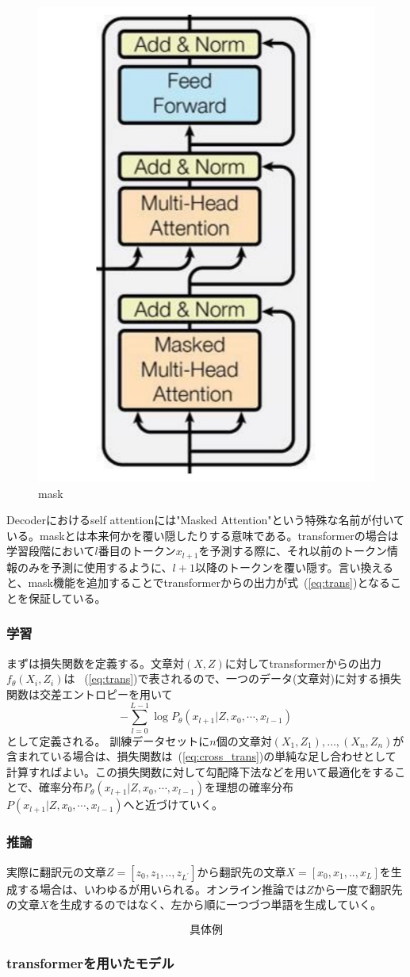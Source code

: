 \begin{figure}
  \centering
  \includegraphics[width=0.5\linewidth]{fig/decoder.pdf}
  \caption{mask}
\label{fig:mask}
\end{figure}

Decoderにおけるself attentionには"Masked Attention"という特殊な名前が付いている。maskとは本来何かを覆い隠したりする意味である。transformerの場合は学習段階において$l$番目のトークン$x_{l+1}$を予測する際に、それ以前のトークン情報のみを予測に使用するように、$l+1$以降のトークンを覆い隠す。言い換えると、mask機能を追加することでtransformerからの出力が式~(\ref{eq:trans})となることを保証している。

\subsubsection{学習}

まずは損失関数を定義する。文章対$(X, Z)$に対してtransformerからの出力$f_\theta(X_i, Z_i)$は
~(\ref{eq:trans})で表されるので、一つのデータ(文章対)に対する損失関数は交差エントロピーを用いて
\begin{equation}
  \label{eq:cross_trans}
  - \sum_{l=0}^{L-1} \log P_\theta(x_{l+1} | Z, x_0, \cdots, x_{l-1} )
\end{equation}
として定義される。
  \label{eq:cross_trans}
訓練データセットに$n$個の文章対$(X_1, Z_1),\ldots, (X_n, Z_n)$が含まれている場合は、損失関数は~(\ref{eq:cross_trans})の単純な足し合わせとして計算すればよい。この損失関数に対して勾配降下法などを用いて最適化をすることで、確率分布$P_\theta(x_{l+1} | Z, x_0, \cdots, x_{l-1} )$を理想の確率分布$P(x_{l+1} | Z, x_0, \cdots, x_{l-1} )$へと近づけていく。 

\subsubsection{推論}
実際に翻訳元の文章$Z = [z_0, z_1, .., z_{L^\prime}]$から翻訳先の文章$X = [x_0, x_1, .., x_{L}]$を生成する場合は、いわゆるが用いられる。オンライン推論では$Z$から一度で翻訳先の文章$X$を生成するのではなく、左から順に一つづつ単語を生成していく。


\begin{equation*}
  \text{具体例}
\end{equation*}


\subsubsection{transformerを用いたモデル}